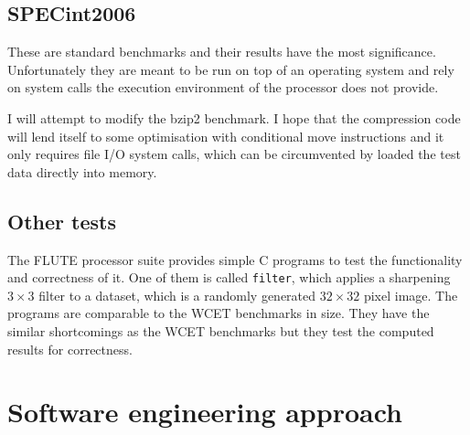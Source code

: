 \documentclass[12pt,twoside,notitlepage]{report}
\begin{document}
\subsection{SPECint2006}
These are standard benchmarks and their results have the most significance. Unfortunately they are meant to be run on top of an operating system and rely on system calls the execution environment of the processor does not provide.

I will attempt to modify the bzip2 benchmark. I hope that the compression code will lend itself to some optimisation with conditional move instructions and it only requires file I/O system calls, which can be circumvented by loaded the test data directly into memory.

\subsection{Other tests}

The FLUTE processor suite provides simple C programs to test the functionality and correctness of it. One of them is called \texttt{filter}, which applies a sharpening $3\times 3$ filter to a dataset, which is a randomly generated $32 \times 32$ pixel image. The programs are comparable to the WCET benchmarks in size. They have the similar shortcomings as the WCET benchmarks but they test the computed results for correctness.

\section{Software engineering approach}
\end{document}
